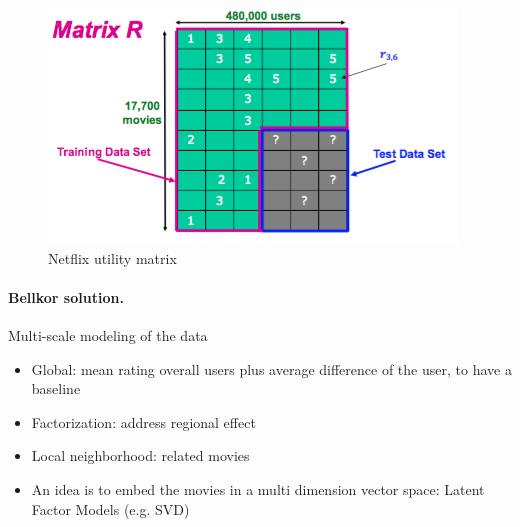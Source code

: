 \begin{figure}
  \centering
  \includegraphics[width=1\linewidth]{figures/netflix_matrix.png}
  \caption{Netflix utility matrix}
  \label{fig:netflix_matrix}
\end{figure}

\paragraph{Bellkor solution.} Multi-scale modeling of the data
\begin{itemize}
  \item Global: mean rating overall users plus average difference of the user, to have a baseline
  \item Factorization: address regional effect
  \item Local neighborhood: related movies
  \item An idea is to embed the movies in a multi dimension vector space: Latent Factor Models (e.g. SVD)
\end{itemize}
